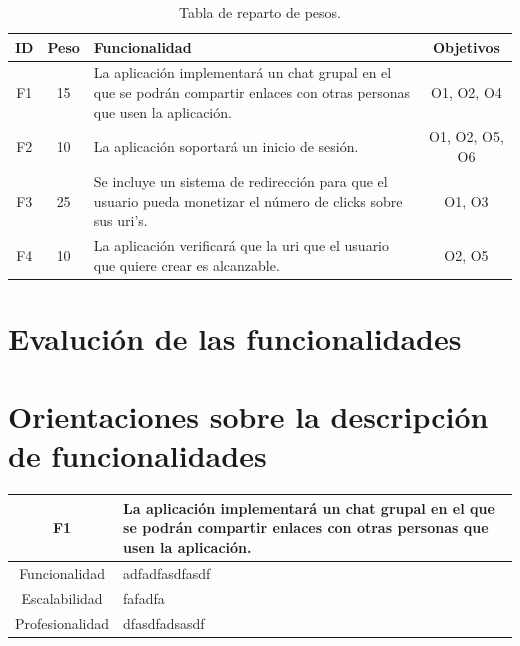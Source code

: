 \documentclass{article}
\begin{document}
\begin{table}[hbtp]
    \footnotesize
    \centering
    \settowidth{}
    \setlength\extrarowheight{5pt}
    \begin{tabulary}{\textwidth}{ C C L C}
        \textbf{ID} & 
        \textbf{Peso} & 
        \textbf{Funcionalidad} & 
        \textbf{Objetivos}\\
    \hline
    \hline
        F1 & 
        15 & 
        La aplicación implementará un chat grupal en el que se podrán compartir enlaces con otras personas que usen la aplicación. &
        O1, O2, O4\\
    \hline  
        F2 &
        10 &
        La aplicación soportará un inicio de sesión. &
        O1, O2, O5, O6\\
    \hline
        F3 &
        25 &
        Se incluye un sistema de redirección para que el usuario pueda monetizar el número de clicks sobre sus uri's. &
        O1, O3\\
    \hline
        F4 &
        10 &
        La aplicación verificará que la uri que el usuario que quiere crear es alcanzable. &
        O2, O5

    \end{tabulary}
    \caption{Tabla de reparto de pesos.}
\end{table}

\pagebreak

\section*{Evalución de las funcionalidades}
\section*{Orientaciones sobre la descripción de funcionalidades}


\pagebreak

\begin{table}[hbtp]
    \footnotesize
    \centering
    \settowidth{}
    \setlength\extrarowheight{5pt}
    \begin{tabulary}{\textwidth}{ C L }
        \textbf{F1} & La aplicación implementará un chat grupal en el que se podrán compartir enlaces con otras personas que usen la aplicación.
        \\
    \hline
    
    Funcionalidad & adfadfasdfasdf\\
        
    Escalabilidad & fafadfa \\

    Profesionalidad & dfasdfadsasdf \\

    \end{tabulary}
\end{table}
\end{document}
